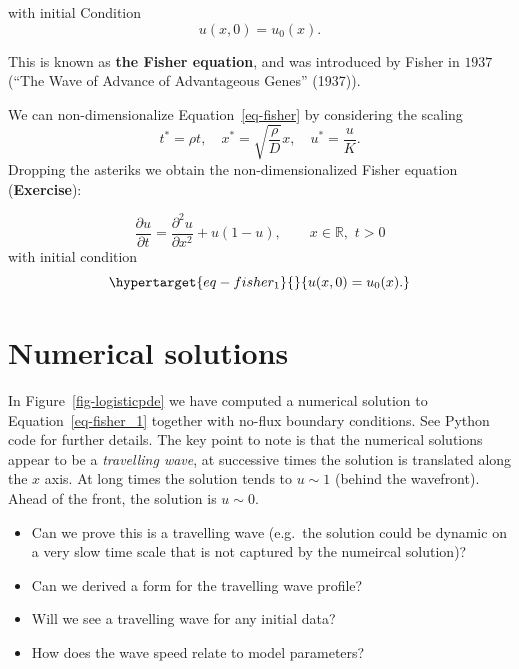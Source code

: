 \documentclass[
  letterpaper,
  DIV=11,
  numbers=noendperiod]{scrreprt}
\providecommand{\tightlist}{%
  \setlength{\itemsep}{0pt}\setlength{\parskip}{0pt}}\usepackage{longtable,booktabs,array}
\theoremstyle{plain}
\theoremstyle{definition}
\theoremstyle{plain}
\theoremstyle{remark}
\begin{document}
with initial Condition \[
u(x,0) =u_0(x). 
\]

This is known as \textbf{the Fisher equation}, and was introduced by
Fisher in \(1937\) ({``The Wave of Advance of Advantageous Genes''}
(1937)).

We can non-dimensionalize Equation~\ref{eq-fisher} by considering the
scaling
\[t^\ast = \rho t, \quad  x^\ast = \sqrt{\dfrac \rho D} x, \quad  u^\ast = \displaystyle{\frac u K}.
\] Dropping the asteriks we obtain the non-dimensionalized Fisher
equation (\textbf{Exercise}):

\[
\frac{\partial u}{\partial t} = \frac{\partial^2 u}{\partial x^2} +   u(1-u), \qquad x\in \mathbb R, \, \, t >0 
\] with initial condition
\begin{equation}\protect\hypertarget{eq-fisher_1}{}{
u(x,0) = u_0(x).
}\label{eq-fisher_1}\end{equation}

\hypertarget{numerical-solutions}{%
\section{Numerical solutions}\label{numerical-solutions}}

In Figure~\ref{fig-logisticpde} we have computed a numerical solution to
Equation~\ref{eq-fisher_1} together with no-flux boundary conditions.
See Python code for further details. The key point to note is that the
numerical solutions appear to be a \emph{travelling wave}, at successive
times the solution is translated along the \(x\) axis. At long times the
solution tends to \(u\sim1\) (behind the wavefront). Ahead of the front,
the solution is \(u\sim0\).

\begin{itemize}
\tightlist
\item
  Can we prove this is a travelling wave (e.g.~the solution could be
  dynamic on a very slow time scale that is not captured by the
  numeircal solution)?
\item
  Can we derived a form for the travelling wave profile?
\item
  Will we see a travelling wave for any initial data?
\item
  How does the wave speed relate to model parameters?
\end{itemize}
\end{document}
